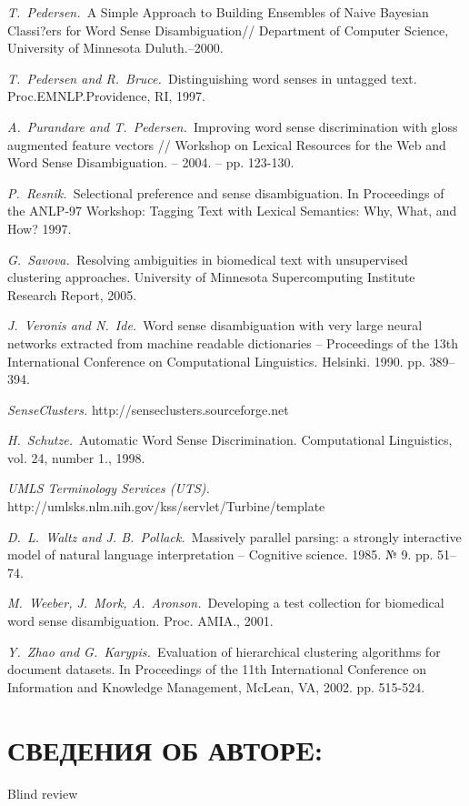 \documentclass{article}
\begin{document}
\begin{articletext}
\begin{thebibliography}{9}
\textit{T.~Pedersen.~}A Simple Approach to Building Ensembles of Naive Bayesian Classi?ers for Word Sense Disambiguation// Department of Computer Science, University of Minnesota Duluth.–2000.

\textit{T.~Pedersen and R.~Bruce.~}Distinguishing word senses in untagged text. Proc.EMNLP.Providence, RI, 1997.

\textit{A.~Purandare and T.~Pedersen.~}Improving word sense discrimination with gloss augmented feature vectors // Workshop on Lexical Resources for the Web and Word Sense Disambiguation. – 2004. – pp. 123-130. 

\textit{P.~Resnik.~}Selectional preference and sense disambiguation. In Proceedings of the ANLP-97 Workshop: Tagging Text with Lexical Semantics: Why, What, and How? 1997.

\textit{G.~Savova.~}Resolving ambiguities in biomedical text with unsupervised clustering approaches. University of Minnesota Supercomputing Institute Research Report, 2005.

\textit{J.~Veronis and N.~Ide.~}Word  sense  disambiguation  with  very  large neural  networks  extracted  from machine readable dictionaries – Proceedings of the 13th International Conference on Computational Linguistics. Helsinki. 1990. pp. 389–394.

\textit{SenseClusters. } http://senseclusters.sourceforge.net

\textit{H.~Schutze.~}Automatic Word Sense Discrimination. Computational Linguistics, vol. 24, number 1., 1998.

\textit{UMLS Terminology Services (UTS).} http://umlsks.nlm.nih.gov/kss/servlet/Turbine/template

\textit{D.~L.~Waltz and J. B.~Pollack.~}Massively parallel parsing: a strongly interactive  model  of  natural  language interpretation – Cognitive science. 1985. № 9. pp. 51–74.

\textit{M.~Weeber, J.~Mork, A.~Aronson.~}Developing a test collection for biomedical word sense disambiguation. Proc. AMIA., 2001.

\textit{Y.~Zhao and G.~Karypis.~}Evaluation of hierarchical clustering algorithms for document datasets. In Proceedings of the 11th International Conference on Information and Knowledge Management, McLean, VA, 2002. pp. 515-524.



\end{thebibliography}
\end{articletext}


\section{СВЕДЕНИЯ ОБ АВТОРE:}

Blind review
\end{document}
